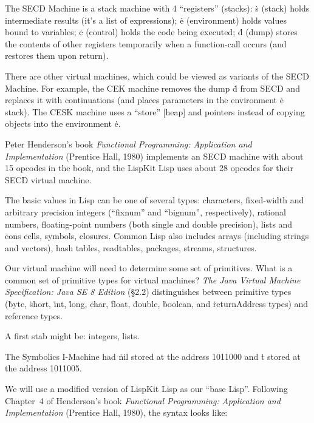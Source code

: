 The SECD Machine is a stack machine with 4 ``registers'' (stacks):
 \.{s} (stack) holds intermediate results (it's a list of
expressions);
 \.{e} (environment) holds values bound to variables;
 \.{c} (control) holds the code being executed;
 \.{d} (dump) stores the contents of other registers
temporarily when a function-call occurs (and restores them upon return).

There are other virtual machines, which could be viewed as variants of
the SECD Machine. For example, the CEK machine removes the dump \.{d}
from SECD and replaces it with continuations (and places parameters in
the environment \.{e} stack). The CESK machine uses a ``store'' [heap]
and pointers instead of copying objects into the environment \.{e}.

Peter Henderson's book {\sl Functional Programming: Application and
Implementation}
(Prentice Hall, 1980)
implements an SECD machine with about 15 opcodes in the book, and the
LispKit Lisp uses about 28 opcodes for their SECD virtual machine.

\fi

The basic values in Lisp can be one of several types: characters,
fixed-width and arbitrary precision integers (``fixnum'' and
``bignum'', respectively), rational numbers, floating-point numbers (both
single and double
precision), lists and \.{cons} cells, symbols, closures. Common Lisp also
includes arrays (including strings and vectors), hash tables,
readtables, packages, streams, structures.

Our virtual machine will need to determine some set of
primitives. What is a common set of primitive types for virtual machines?
{\it The Java\registeredtrademark{} Virtual Machine Specification: Java SE 8
Edition} (\S2.2) distinguishes
between primitive types
(\.{byte}, \.{short}, \.{int}, \.{long}, \.{char}, \.{float}, \.{double},
\.{boolean}, and \.{returnAddress} types) and reference types.

A first stab might be: integers, lists.

\fi

\enspace\ignorespaces%
The Symbolics I-Machine had \.{nil} stored at the address 1011000
and \.{t} stored at the address 1011005.

\fi

\enspace\ignorespaces%
We will use a modified version of LispKit Lisp as our ``base
Lisp''. Following Chapter~4 of Henderson's book {\sl Functional Programming:
Application and Implementation}
(Prentice Hall, 1980), the syntax looks like:

